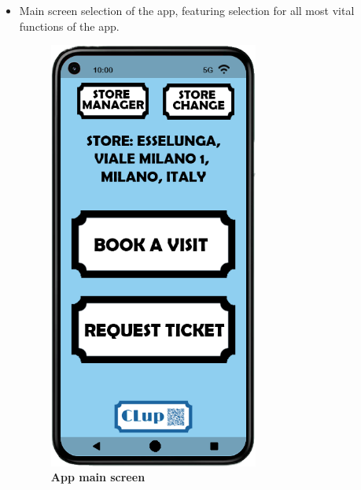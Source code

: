 \begin{itemize}
\item Main screen selection of the app, featuring selection for all most vital functions of the app. 
\begin{figure}[!htb]
\centering
\begin{minipage}{0.4\textwidth}
\centering
\includegraphics[width=0.65\textwidth]{Images/App/Android_MainScreenv3}
\caption{\label{fig:androidmainscreen}\textbf{App main screen}}
\end{minipage}
\begin{minipage}{0.4\textwidth}
\centering

\end{minipage}
\end{figure}
\end{itemize}
